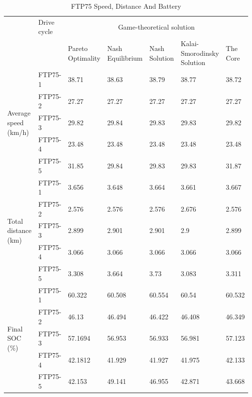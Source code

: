 \begin{table}[h]
\centering
\begin{tabular}{ |p{1.5cm}|p{1.5cm}|p{1.3cm}|p{1.3cm}|p{1.3cm}|p{1.3cm}|p{1.3cm}|} 
 \hline
  \cline{3-7}
   & Drive cycle & \multicolumn{5}{|c|}{Game-theoretical solution} \\
   \cline{3-7}
   & & Pareto Optimality & Nash Equilibrium & Nash Solution & Kalai- Smorodinsky Solution & The Core\\
 \hline\hline
 \multirow{5}{*}{\parbox{1.5cm}{Average speed (km/h)}}
 & FTP75-1 & 38.71 & 38.63 & 38.79 & 38.77 & 38.72 \\
 & FTP75-2 & 27.27 & 27.27 & 27.27 & 27.27 & 27.27 \\ 
 & FTP75-3 & 29.82 & 29.84 & 29.83 & 29.83 & 29.82 \\ 
 & FTP75-4 & 23.48 & 23.48 & 23.48 & 23.48 & 23.48 \\ 
 & FTP75-5 & 31.85 & 29.84 & 29.83 & 29.83 & 31.87 \\ 
 \hline 
 \multirow{5}{*}{\parbox{1.5cm}{Total distance (km)}}
 & FTP75-1 & 3.656 & 3.648 & 3.664 & 3.661 & 3.667 \\ 
 & FTP75-2 & 2.576 & 2.576 & 2.576 & 2.676 & 2.576 \\ 
 & FTP75-3 & 2.899 & 2.901 & 2.901 & 2.9 & 2.899 \\ 
 & FTP75-4 & 3.066 & 3.066 & 3.066 & 3.066 & 3.066 \\ 
 & FTP75-5 & 3.308 & 3.664 & 3.73 & 3.083 & 3.311 \\ 
 \hline 
 \multirow{5}{*}{\parbox{1.5cm}{Final SOC (\%)}}
 & FTP75-1 & 60.322 & 60.508 & 60.554 & 60.54 & 60.532 \\ 
 & FTP75-2 & 46.13 & 46.494 & 46.422 & 46.408 & 46.349 \\ 
 & FTP75-3 & 57.1694 & 56.953 & 56.933 & 56.981 & 57.123 \\ 
 & FTP75-4 & 42.1812 & 41.929 & 41.927 & 41.975 & 42.133 \\ 
 & FTP75-5 & 42.153 & 49.141 & 46.955 & 42.871 & 43.668 \\ 
 \hline

 \hline
\end{tabular}
\caption{FTP75 Speed, Distance And Battery}
\label{tab:soc}
\end{table}
